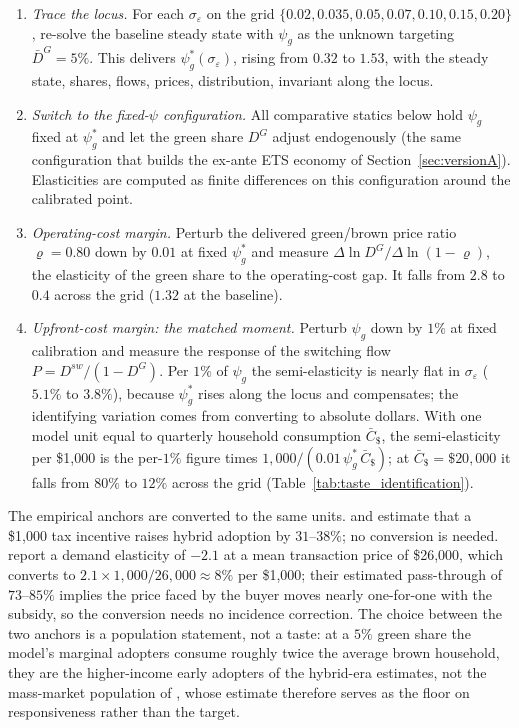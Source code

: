 \begin{enumerate}\itemsep3pt
\item \emph{Trace the locus.} For each $\sigma_\varepsilon$ on the grid
$\{0.02, 0.035, 0.05, 0.07, 0.10, 0.15, 0.20\}$, re-solve the baseline steady
state with $\psi_g$ as the unknown targeting $\bar D^G = 5\%$. This delivers
$\psi_g^*(\sigma_\varepsilon)$, rising from $0.32$ to $1.53$, with the steady
state, shares, flows, prices, distribution, invariant along the locus.

\item \emph{Switch to the fixed-$\psi$ configuration.} All comparative statics
below hold $\psi_g$ fixed at $\psi_g^*$ and let the green share $D^G$ adjust
endogenously (the same configuration that builds the ex-ante ETS economy of
Section~\ref{sec:versionA}). Elasticities are computed as finite differences on
this configuration around the calibrated point.

\item \emph{Operating-cost margin.} Perturb the delivered green/brown price
ratio $\varrho = 0.80$ down by $0.01$ at fixed $\psi_g^*$ and measure
$\Delta \ln D^G / \Delta \ln (1-\varrho)$, the elasticity of the green share to
the operating-cost gap. It falls from $2.8$ to $0.4$ across the grid ($1.32$ at
the baseline).

\item \emph{Upfront-cost margin: the matched moment.} Perturb $\psi_g$ down by
$1\%$ at fixed calibration and measure the response of the switching flow
$P = D^{sw}/(1-D^G)$. Per $1\%$ of $\psi_g$ the semi-elasticity is nearly flat
in $\sigma_\varepsilon$ ($5.1\%$ to $3.8\%$), because $\psi_g^*$ rises along the
locus and compensates; the identifying variation comes from converting to
absolute dollars. With one model unit equal to quarterly household consumption
$\bar C_{\$}$, the semi-elasticity per \$1{,}000 is the per-$1\%$ figure times
$1{,}000/(0.01\,\psi_g^*\,\bar C_{\$})$; at $\bar C_{\$} = \$20{,}000$ it falls
from $80\%$ to $12\%$ across the grid
(Table~\ref{tab:taste_identification}).
\end{enumerate}

The empirical anchors are converted to the same units.
\citet{GallagherMuehlegger2011} and \citet{Chandra2010} estimate that a
\$1{,}000 tax incentive raises hybrid adoption by $31$--$38\%$; no conversion is
needed. \citet{MuehleggerRapson2022} report a demand elasticity of $-2.1$ at a
mean transaction price of \$26{,}000, which converts to
$2.1 \times 1{,}000/26{,}000 \approx 8\%$ per \$1{,}000; their estimated
pass-through of $73$--$85\%$ implies the price faced by the buyer moves nearly
one-for-one with the subsidy, so the conversion needs no incidence correction.
The choice between the two anchors is a population statement, not a taste: at a
$5\%$ green share the model's marginal adopters consume roughly twice the
average brown household, they are the higher-income early adopters of the
hybrid-era estimates, not the mass-market population of
\citet{MuehleggerRapson2022}, whose estimate therefore serves as the floor on
responsiveness rather than the target.


